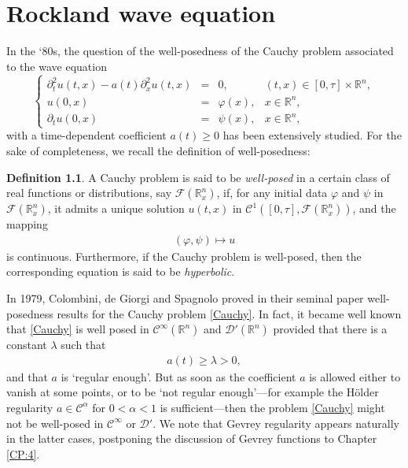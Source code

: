\documentclass[12pt,oneside,a4paper]{book}
\numberwithin{equation}{section}     %
\theoremstyle{plain}
\theoremstyle{definition}
\newtheorem{definition}[theorem]{Definition}
\newcommand{\R}{{\mathbb R}}
\newcommand{\Rn}{{\R}^n}
\begin{document}
\chapter{Rockland wave equation}
\label{CP:3}
In the `80s, the question of the well-posedness of the Cauchy problem associated to the wave equation
\begin{equation}\label{Cauchy}
\left\{\begin{array}{rclc}
\partial ^2_{t}u(t,x)-a(t)\partial ^2_{x}u(t,x)	&=&0,			&(t,x)\in [0,\tau]\times\Rn,\\
u(0,x)	&=&\varphi(x),	&x\in\Rn,\\
\partial _t u(0,x)	&=&\psi(x),		&x\in\Rn,
\end{array}\right.
\end{equation}
with a time-dependent coefficient $a(t)\geq 0$ has been extensively studied. For the sake of completeness, we recall the definition of well-posedness:
\begin{definition}
	A Cauchy problem is said to be \textit{well-posed} in a certain class of real functions or distributions, say $\mathcal{F}{(\Rn_x)}$, if, for any initial data $\varphi$ and $\psi$ in $\mathcal{F}{(\Rn_x)}$, it admits a unique solution $u(t,x)$ in $\mathcal{C}^1([0,\tau],\mathcal{F}(\Rn_x))$, and the mapping 
	\begin{align*}
	(\varphi,\psi)\mapsto u 
	\end{align*} 
	is continuous. Furthermore, if the Cauchy problem is well-posed, then the corresponding equation is said to be \textit{hyperbolic}.
\end{definition}

In 1979, Colombini, de Giorgi and Spagnolo proved in their seminal paper \cite{CDS79} well-posedness results for the Cauchy problem \eqref{Cauchy}. In fact, it became well known that \eqref{Cauchy} is well posed in $\mathcal{C}^\infty(\Rn)$ and $\mathcal{D}'(\Rn)$ provided that there is a constant $\lambda$ such that
\begin{align*}
a(t)\geq\lambda>0,
\end{align*}
and that $a$ is `regular enough'. But as soon as the coefficient $a$ is allowed either to vanish at some points, or to be `not regular enough'---for example the H\"older regularity $a\in \mathcal C^\alpha$ for $0<\alpha<1$ is sufficient---then the problem \eqref{Cauchy} might not be well-posed in $\mathcal C^\infty$ or $\mathcal{D}'$. We note that Gevrey regularity appears naturally in the latter cases, postponing the discussion of Gevrey functions to Chapter \ref{CP:4}.
\end{document}
